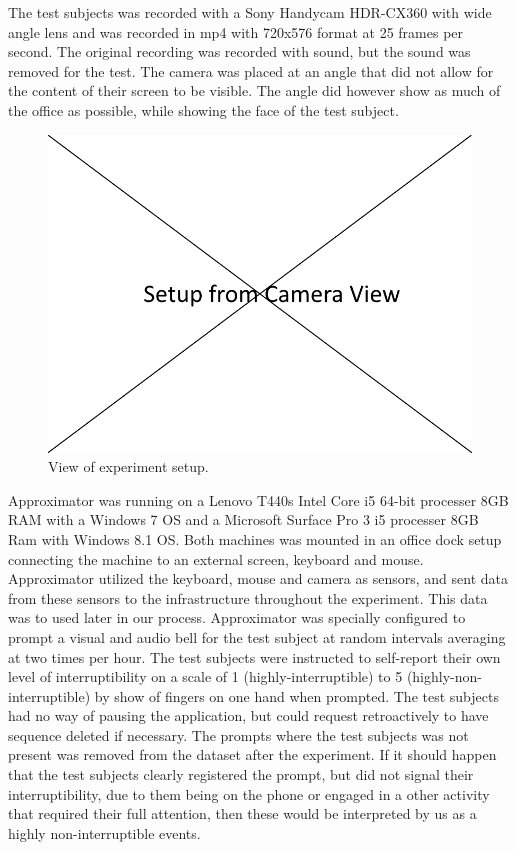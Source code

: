 \documentclass{sigchi}
\begin{document}
The test subjects was recorded with a Sony Handycam HDR-CX360 with wide angle lens and was recorded in mp4 with 720x576 format at 25 frames per second.
The original recording was recorded with sound, but the sound was removed for the test.
The camera was placed at an angle that did not allow for the content of their screen to be visible.
The angle did however show as much of the office as possible, while showing the face of the test subject.

\begin{figure}
  \centering
  \includegraphics[width=\columnwidth]{figures/experiment_setup.png}
  \caption{View of experiment setup.}
  \label{fig:experiment}
\end{figure}

Approximator was running on a Lenovo T440s Intel Core i5 64-bit processer 8GB RAM with a Windows 7 OS and a Microsoft Surface Pro 3 i5 processer 8GB Ram with Windows 8.1 OS.
Both machines was mounted in an office dock setup connecting the machine to an external screen, keyboard and mouse.
Approximator utilized the keyboard, mouse and camera as sensors, and sent data from these sensors to the infrastructure throughout the experiment.
This data was to used later in our process.
Approximator was specially configured to prompt a visual and audio bell for the test subject at random intervals averaging at two times per hour.
The test subjects were instructed to self-report their own level of interruptibility on a scale of 1 (highly-interruptible) to 5 (highly-non-interruptible) by show of fingers on one hand when prompted.
The test subjects had no way of pausing the application, but could request retroactively to have sequence deleted if necessary.
The prompts where the test subjects was not present was removed from the dataset after the experiment.
If it should happen that the test subjects clearly registered the prompt, but did not signal their interruptibility, due to them being on the phone or engaged in a other activity that required their full attention, then these would be interpreted by us as a highly non-interruptible events.
\end{document}
